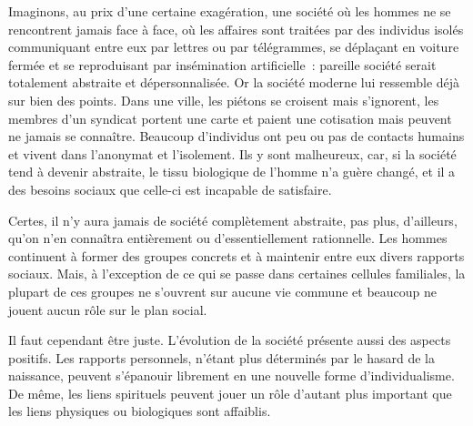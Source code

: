 {Imaginons, au prix d'une
certaine exagération, une société où les hommes ne se rencontrent
jamais face à face, où les affaires sont traitées par des individus
isolés communiquant entre eux par lettres ou par télégrammes, se
déplaçant en voiture fermée et se reproduisant par insémination
artificielle~: pareille société serait totalement abstraite et
dépersonnalisée. Or la société moderne lui ressemble déjà sur bien
des points. Dans une ville, les piétons se croisent mais s'ignorent,
les membres d'un syndicat portent une carte et paient une cotisation
mais peuvent ne jamais se connaître. Beaucoup d'individus ont peu ou
pas de contacts humains et vivent dans l'anonymat et l'isolement. Ils
y sont malheureux, car, si la société tend à devenir abstraite, le
tissu biologique de l'homme n'a guère changé, et il a des besoins
sociaux que celle-ci est incapable de satisfaire.

Certes, il n'y aura jamais de société complètement abstraite, pas
plus, d'ailleurs, qu'on n'en connaîtra entièrement ou
d'essentiellement rationnelle. Les hommes continuent à former des
groupes concrets et à maintenir entre eux divers rapports sociaux.
Mais, à l'exception de ce qui se passe dans certaines cellules
familiales, la plupart de ces groupes ne s'ouvrent sur aucune vie
commune et beaucoup ne jouent aucun rôle sur le plan social.

Il faut cependant être juste. L'évolution de la société présente aussi
des aspects positifs. Les rapports personnels, n'étant plus
déterminés par le hasard de la naissance, peuvent s'épanouir
librement en une nouvelle forme d'individualisme. De même, les liens
spirituels peuvent jouer un rôle d'autant plus important que les
liens physiques ou biologiques sont affaiblis.
}

